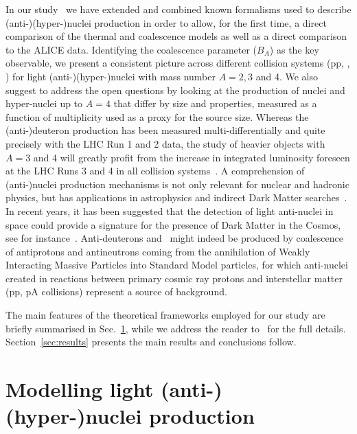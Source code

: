 \documentclass{appolb}
\begin{document}
In our study~\cite{Bellini:2018epz} we have extended and combined known formalisms used to describe (anti-)(hyper-)nuclei production in order to allow, for the first time, a direct comparison of the thermal and coalescence models as well as a direct comparison to the ALICE data. 
Identifying the coalescence parameter ($B_A$) as the key observable, we present a consistent picture across different collision systems (pp, \pPb, \PbPb) for light (anti-)(hyper-)nuclei with mass number $A = 2, 3$ and 4.
We also suggest to address the open questions by looking at the production of nuclei and hyper-nuclei up to $A = 4$ that differ by size and properties, measured as a function of multiplicity used as a proxy for the source size. 
Whereas the (anti-)deuteron production has been measured multi-differentially and quite precisely with the LHC Run 1 and 2 data, the study of heavier objects with $A=3$ and 4 will greatly profit from the increase in integrated luminosity foreseen at the LHC Runs 3 and 4 in all collision systems~\cite{Citron:2018lsq}. 
A comprehension of (anti-)nuclei production mechanisms is not only relevant for nuclear and hadronic physics, but has applications in astrophysics and indirect Dark Matter searches~\cite{Aramaki:2015pii}. In recent years, it has been suggested that the detection of light anti-nuclei in space could provide a signature for the presence of Dark Matter in the Cosmos, see for instance~\cite{Cirelli:2014qia, Korsmeier:2017xzj}. 
Anti-deuterons and \antihethree~might indeed be produced by coalescence of antiprotons and antineutrons coming from the annihilation of Weakly Interacting Massive Particles into Standard Model particles, for which anti-nuclei created in reactions between primary cosmic ray protons and interstellar matter (pp, pA collisions) represent a source of background.

The main features of the theoretical frameworks employed for our study are briefly summarised in Sec.~\ref{sec:prod}, while we address the reader to~\cite{Bellini:2018epz} for the full details. Section~\ref{sec:results} presents the main results and conclusions follow.


\section{Modelling light (anti-)(hyper-)nuclei production} \label{sec:prod}
\end{document}
